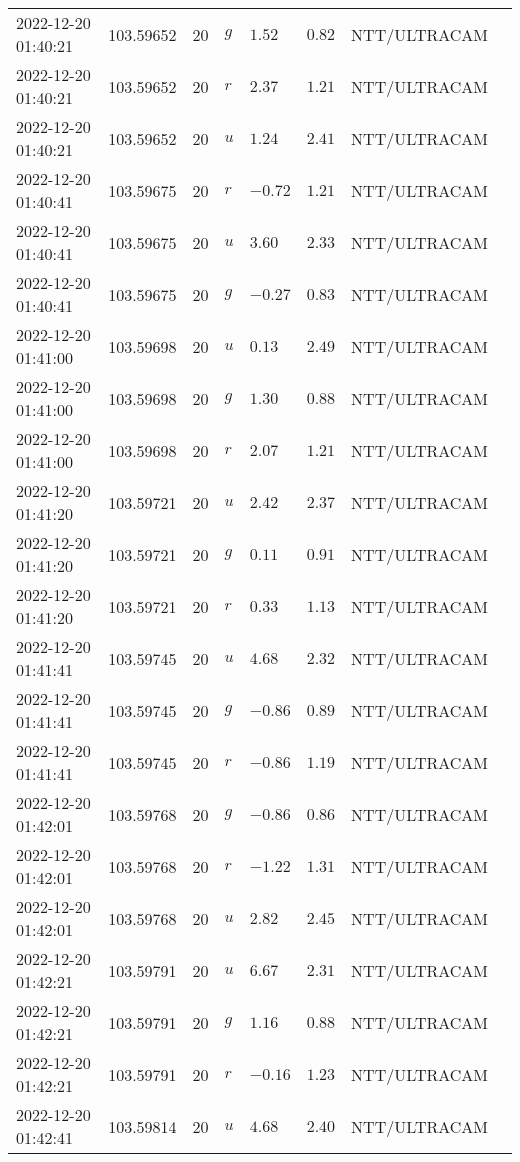 \documentclass{nature_plusfigure}
\begin{document}
\begin{supplement}
\begin{center}
\begin{longtable}{llllllll}
2022-12-20 01:40:21 & 103.59652 & 20 & $g$ & $1.52$ & $0.82$ & NTT/ULTRACAM &  \\ 
2022-12-20 01:40:21 & 103.59652 & 20 & $r$ & $2.37$ & $1.21$ & NTT/ULTRACAM &  \\ 
2022-12-20 01:40:21 & 103.59652 & 20 & $u$ & $1.24$ & $2.41$ & NTT/ULTRACAM &  \\ 
2022-12-20 01:40:41 & 103.59675 & 20 & $r$ & $-0.72$ & $1.21$ & NTT/ULTRACAM &  \\ 
2022-12-20 01:40:41 & 103.59675 & 20 & $u$ & $3.60$ & $2.33$ & NTT/ULTRACAM &  \\ 
2022-12-20 01:40:41 & 103.59675 & 20 & $g$ & $-0.27$ & $0.83$ & NTT/ULTRACAM &  \\ 
2022-12-20 01:41:00 & 103.59698 & 20 & $u$ & $0.13$ & $2.49$ & NTT/ULTRACAM &  \\ 
2022-12-20 01:41:00 & 103.59698 & 20 & $g$ & $1.30$ & $0.88$ & NTT/ULTRACAM &  \\ 
2022-12-20 01:41:00 & 103.59698 & 20 & $r$ & $2.07$ & $1.21$ & NTT/ULTRACAM &  \\ 
2022-12-20 01:41:20 & 103.59721 & 20 & $u$ & $2.42$ & $2.37$ & NTT/ULTRACAM &  \\ 
2022-12-20 01:41:20 & 103.59721 & 20 & $g$ & $0.11$ & $0.91$ & NTT/ULTRACAM &  \\ 
2022-12-20 01:41:20 & 103.59721 & 20 & $r$ & $0.33$ & $1.13$ & NTT/ULTRACAM &  \\ 
2022-12-20 01:41:41 & 103.59745 & 20 & $u$ & $4.68$ & $2.32$ & NTT/ULTRACAM &  \\ 
2022-12-20 01:41:41 & 103.59745 & 20 & $g$ & $-0.86$ & $0.89$ & NTT/ULTRACAM &  \\ 
2022-12-20 01:41:41 & 103.59745 & 20 & $r$ & $-0.86$ & $1.19$ & NTT/ULTRACAM &  \\ 
2022-12-20 01:42:01 & 103.59768 & 20 & $g$ & $-0.86$ & $0.86$ & NTT/ULTRACAM &  \\ 
2022-12-20 01:42:01 & 103.59768 & 20 & $r$ & $-1.22$ & $1.31$ & NTT/ULTRACAM &  \\ 
2022-12-20 01:42:01 & 103.59768 & 20 & $u$ & $2.82$ & $2.45$ & NTT/ULTRACAM &  \\ 
2022-12-20 01:42:21 & 103.59791 & 20 & $u$ & $6.67$ & $2.31$ & NTT/ULTRACAM &  \\ 
2022-12-20 01:42:21 & 103.59791 & 20 & $g$ & $1.16$ & $0.88$ & NTT/ULTRACAM &  \\ 
2022-12-20 01:42:21 & 103.59791 & 20 & $r$ & $-0.16$ & $1.23$ & NTT/ULTRACAM &  \\ 
2022-12-20 01:42:41 & 103.59814 & 20 & $u$ & $4.68$ & $2.40$ & NTT/ULTRACAM &  \\ 

\end{longtable}
\end{center}
\end{supplement}
\end{document}

